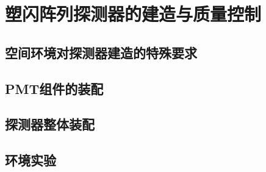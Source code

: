 \chapter{塑闪阵列探测器的建造与质量控制}

\section{空间环境对探测器建造的特殊要求}

\section{PMT组件的装配}

\section{探测器整体装配}

\section{环境实验}